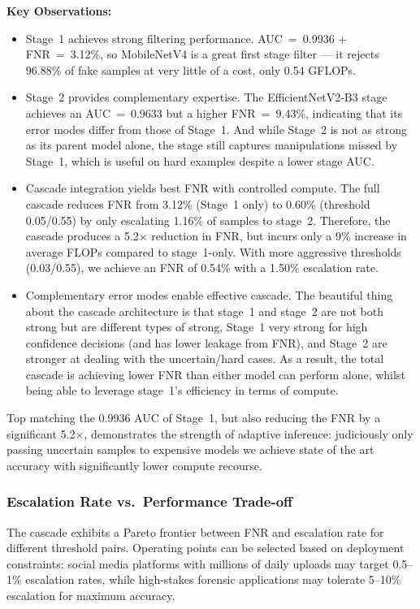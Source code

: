 \textbf{Key Observations:}
\begin{itemize}[leftmargin=*,itemsep=2pt,parsep=0pt]
  \item Stage~1 achieves strong filtering performance. AUC~=~0.9936 + FNR~=~3.12\%, so MobileNetV4 is a great first stage filter --- it rejects 96.88\% of fake samples at very little of a cost, only 0.54 GFLOPs.

  \item Stage~2 provides complementary expertise. The EfficientNetV2\hyp B3 stage achieves an AUC~=~0.9633 but a higher FNR~=~9.43\%, indicating that its error modes differ from those of Stage~1. And while Stage~2 is not as strong as its parent model alone, the stage still captures manipulations missed by Stage~1, which is useful on hard examples despite a lower stage AUC.

  \item Cascade integration yields best FNR with controlled compute. The full cascade reduces FNR from 3.12\% (Stage~1 only) to 0.60\% (threshold 0.05/0.55) by only escalating 1.16\% of samples to stage~2. Therefore, the cascade produces a 5.2× reduction in FNR, but incurs only a 9\% increase in average FLOPs compared to stage~1\hyp only. With more aggressive thresholds (0.03/0.55), we achieve an FNR of 0.54\% with a 1.50\% escalation rate.

  \item Complementary error modes enable effective cascade. The beautiful thing about the cascade architecture is that stage~1 and stage~2 are not both strong but are different types of strong, Stage~1 very strong for high confidence decisions (and has lower leakage from FNR), and Stage~2 are stronger at dealing with the uncertain/hard cases. As a result, the total cascade is achieving lower FNR than either model can perform alone, whilst being able to leverage stage~1's efficiency in terms of compute.
\end{itemize}

Top matching the 0.9936 AUC of Stage~1, but also reducing the FNR by a significant 5.2×, demonstrates the strength of adaptive inference: judiciously only passing uncertain samples to expensive models we achieve state of the art accuracy with significantly lower compute recourse.

\subsubsection{Escalation Rate vs.\ Performance Trade-off}
The cascade exhibits a Pareto frontier between FNR and escalation rate for different threshold pairs. Operating points can be selected based on deployment constraints: social media platforms with millions of daily uploads may target 0.5–1\% escalation rates, while high\hyp stakes forensic applications may tolerate 5–10\% escalation for maximum accuracy.

